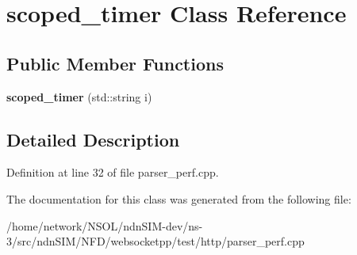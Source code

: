\hypertarget{classscoped__timer}{}\section{scoped\+\_\+timer Class Reference}
\label{classscoped__timer}
\subsection*{Public Member Functions}
\begin{DoxyCompactItemize}
\item 
{\bfseries scoped\+\_\+timer} (std\+::string i)\hypertarget{classscoped__timer_af0b177ccdf9f0d371548c47bbee73f9b}{}\label{classscoped__timer_af0b177ccdf9f0d371548c47bbee73f9b}

\end{DoxyCompactItemize}


\subsection{Detailed Description}


Definition at line 32 of file parser\+\_\+perf.\+cpp.



The documentation for this class was generated from the following file\+:\begin{DoxyCompactItemize}
\item 
/home/network/\+N\+S\+O\+L/ndn\+S\+I\+M-\/dev/ns-\/3/src/ndn\+S\+I\+M/\+N\+F\+D/websocketpp/test/http/parser\+\_\+perf.\+cpp\end{DoxyCompactItemize}
